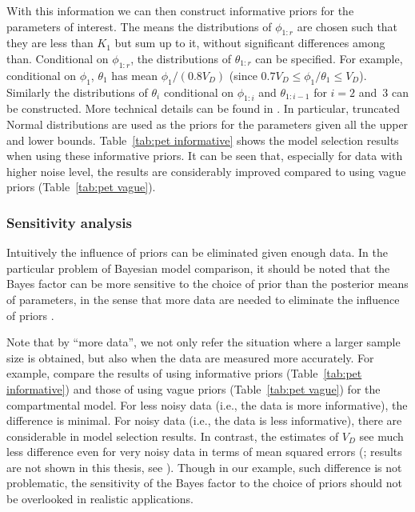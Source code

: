 With this information we can then construct informative priors for the parameters of interest. The means the distributions of $\phi_{1:r}$ are chosen such that they are less than $K_1$ but sum up to it, without significant differences among than. Conditional on $\phi_{1:r}$, the distributions of $\theta_{1:r}$ can be specified. For example, conditional on $\phi_1$, $\theta_1$ has mean $\phi_1/(0.8V_D)$ (since $0.7V_D \le \phi_1/\theta_1 \le V_D$). Similarly the distributions of $\theta_i$ conditional on $\phi_{1:i}$ and $\theta_{1:i-1}$ for $i = 2$ and~$3$ can be constructed. More technical details can be found in \cite{Zhou2013}. In particular, truncated Normal distributions are used as the priors for the parameters given all the upper and lower bounds. Table~\ref{tab:pet informative} shows the model selection results when using these informative priors. It can be seen that, especially for data with higher noise level, the results are considerably improved compared to using vague priors (Table~\ref{tab:pet vague}).



\subsubsection{Sensitivity analysis}
\label{ssub:Sensitivity analysis}

Intuitively the influence of priors can be eliminated given enough data. In the particular problem of Bayesian model comparison, it should be noted that the Bayes factor can be more sensitive to the choice of prior than the posterior means of parameters, in the sense that more data are needed to eliminate the influence of priors \cite{Kass:1993vy,Kass:1995vb}.

Note that by ``more data'', we not only refer the situation where a larger sample size is obtained, but also when the data are measured more accurately. For example, compare the results of using informative priors (Table~\ref{tab:pet informative}) and those of using vague priors (Table~\ref{tab:pet vague}) for the \pet compartmental model. For less noisy data (i.e., the data is more informative), the difference is minimal. For noisy data (i.e., the data is less informative), there are considerable  in model selection results. In contrast, the estimates of $V_D$ see much less difference even for very noisy data in terms of mean squared errors (\mse; results are not shown in this thesis, see \cite{Zhou2013}). Though in our example, such difference is not problematic, the sensitivity of the Bayes factor to the choice of priors should not be overlooked in realistic applications.

